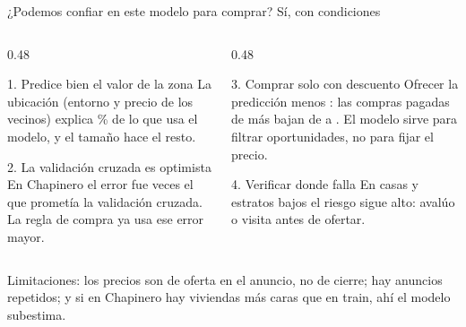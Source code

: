 \documentclass[aspectratio=169, 10pt]{beamer}
\newcommand{\nota}[1]{\vfill{\scriptsize\color{black!60}#1\par}}
\begin{document}
\begin{frame}{¿Podemos confiar en este modelo para comprar? S\'i, con condiciones}
  \vspace{3mm}
  \begin{columns}[T, onlytextwidth]
    \begin{column}{0.48\textwidth}
      \begin{alertblock}{1. Predice bien el valor de la zona}
        \footnotesize La ubicaci\'on (entorno y precio de los vecinos) explica \GainUbicacion\% de lo que usa el modelo, y el tama\~no hace el resto.
      \end{alertblock}
      \begin{alertblock}{2. La validaci\'on cruzada es optimista}
        \footnotesize En Chapinero el error fue \FactorKaggle{} veces el que promet\'ia la validaci\'on cruzada. La regla de compra ya usa ese error mayor.
      \end{alertblock}
    \end{column}
    \begin{column}{0.48\textwidth}
      \begin{alertblock}{3. Comprar solo con descuento}
        \footnotesize Ofrecer la predicci\'on menos \MargenRegla: las compras pagadas de m\'as bajan de \RiesgoSinMargen{} a \RiesgoRegla. El modelo sirve para filtrar oportunidades, no para fijar el precio.
      \end{alertblock}
      \begin{alertblock}{4. Verificar donde falla}
        \footnotesize En casas y estratos bajos el riesgo sigue alto: aval\'uo o visita antes de ofertar.
      \end{alertblock}
    \end{column}
  \end{columns}
  \nota{Limitaciones: los precios son de oferta en el anuncio, no de cierre; hay anuncios repetidos; y si en Chapinero hay viviendas m\'as caras que en train, ah\'i el modelo subestima.}
\end{frame}
\end{document}
